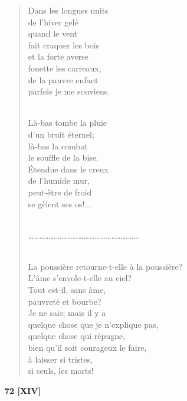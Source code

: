 \documentclass[a4paper,12pt]{book}
\begin{document}
\begin{verse}
Dans les longues nuits \\
de l'hiver gelé \\
quand le vent \\
fait craquer les bois \\
et la forte averse \\
fouette les carreaux, \\
de la pauvre enfant \\
parfois je me souviens. \\ \

Là-bas tombe la pluie \\
d'un bruit éternel; \\
là-bas la combat \\
le souffle de la bise. \\
Étendue dans le creux \\
de l'humide mur, \\
peut-être de froid \\
se gèlent ses os!... \\ \

\ldots\ldots\ldots\ldots\ldots\ldots\ldots\ldots\ldots\ldots\ldots\ldots\ldots\ldots\ldots\ldots\ldots\ldots\ldots\ldots \\ \

La poussière retourne-t-elle à la poussière? \\
L'âme s'envole-t-elle au ciel? \\
Tout est-il, sans âme, \\
pauvreté et bourbe? \\
Je ne sais; mais il y a \\
quelque chose que je n'explique pas, \\
quelque chose qui répugne, \\
bien qu'il soit courageux le faire, \\
à laisser si tristes, \\
si seuls, les morts! \\
\end{verse}

\bigskip

\begin{center} {\bf 72 [XIV]} \end{center}
\end{document}

